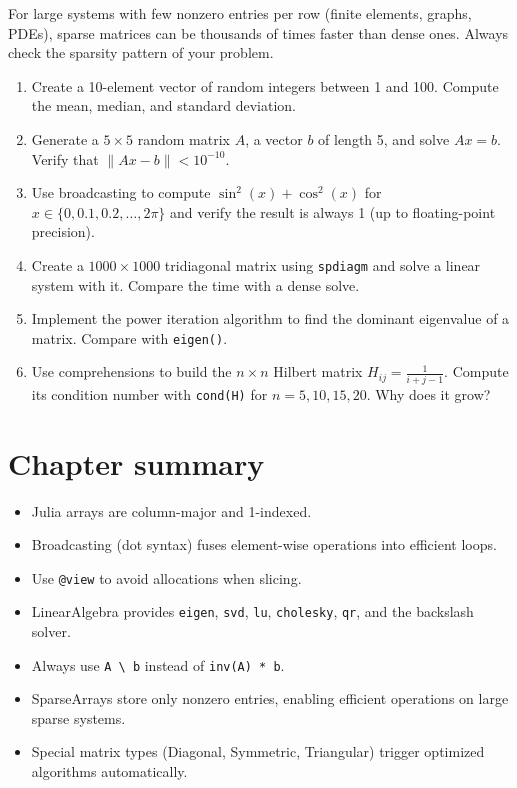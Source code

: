 \begin{performancetip}
For large systems with few nonzero entries per row (finite elements, graphs, PDEs), sparse matrices can be thousands of times faster than dense ones. Always check the sparsity pattern of your problem.
\end{performancetip}

\begin{exercise}
\begin{enumerate}
  \item Create a 10-element vector of random integers between 1 and 100. Compute the mean, median, and standard deviation.
  \item Generate a $5 \times 5$ random matrix $A$, a vector $b$ of length 5, and solve $Ax = b$. Verify that $\|Ax - b\| < 10^{-10}$.
  \item Use broadcasting to compute $\sin^2(x) + \cos^2(x)$ for $x \in \{0, 0.1, 0.2, \ldots, 2\pi\}$ and verify the result is always 1 (up to floating-point precision).
  \item Create a $1000 \times 1000$ tridiagonal matrix using \texttt{spdiagm} and solve a linear system with it. Compare the time with a dense solve.
  \item Implement the power iteration algorithm to find the dominant eigenvalue of a matrix. Compare with \texttt{eigen()}.
  \item Use comprehensions to build the $n \times n$ Hilbert matrix $H_{ij} = \frac{1}{i + j - 1}$. Compute its condition number with \texttt{cond(H)} for $n = 5, 10, 15, 20$. Why does it grow?
\end{enumerate}
\end{exercise}

\section{Chapter summary}

\begin{itemize}
  \item Julia arrays are column-major and 1-indexed.
  \item Broadcasting (dot syntax) fuses element-wise operations into efficient loops.
  \item Use \texttt{@view} to avoid allocations when slicing.
  \item LinearAlgebra provides \texttt{eigen}, \texttt{svd}, \texttt{lu}, \texttt{cholesky}, \texttt{qr}, and the backslash solver.
  \item Always use \texttt{A \textbackslash{} b} instead of \texttt{inv(A) * b}.
  \item SparseArrays store only nonzero entries, enabling efficient operations on large sparse systems.
  \item Special matrix types (Diagonal, Symmetric, Triangular) trigger optimized algorithms automatically.
\end{itemize}
